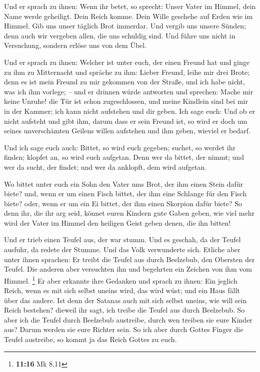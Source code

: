  Und er sprach zu ihnen: Wenn ihr betet, so sprecht: Unser
Vater im Himmel, dein Name werde geheiligt. Dein Reich komme. Dein Wille
geschehe auf Erden wie im Himmel.  Gib uns unser täglich
Brot immerdar.  Und vergib uns unsere Sünden; denn auch wir
vergeben allen, die uns schuldig sind. Und führe uns nicht in
Versuchung, sondern erlöse uns von dem Übel.

 Und er sprach zu ihnen: Welcher ist unter euch, der einen
Freund hat und ginge zu ihm zu Mitternacht und spräche zu ihm: Lieber
Freund, leihe mir drei Brote;  denn es ist mein Freund zu
mir gekommen von der Straße, und ich habe nicht, was ich ihm vorlege; --
 und er drinnen würde antworten und sprechen: Mache mir
keine Unruhe! die Tür ist schon zugeschlossen, und meine Kindlein sind
bei mir in der Kammer; ich kann nicht aufstehen und dir geben.
 Ich sage euch: Und ob er nicht aufsteht und gibt ihm, darum
dass er sein Freund ist, so wird er doch um seines unverschämten Geilens
willen aufstehen und ihm geben, wieviel er bedarf.

 Und ich sage euch auch: Bittet, so wird euch gegeben;
suchet, so werdet ihr finden; klopfet an, so wird euch aufgetan.
 Denn wer da bittet, der nimmt; und wer da sucht, der
findet; und wer da anklopft, dem wird aufgetan.

 Wo bittet unter euch ein Sohn den Vater ums Brot, der ihm
einen Stein dafür biete? und, wenn er um einen Fisch bittet, der ihm
eine Schlange für den Fisch biete?  oder, wenn er um ein Ei
bittet, der ihm einen Skorpion dafür biete?  So denn ihr,
die ihr arg seid, könnet euren Kindern gute Gaben geben, wie viel mehr
wird der Vater im Himmel den heiligen Geist geben denen, die ihn bitten!

 Und er trieb einen Teufel aus, der war stumm. Und es
geschah, da der Teufel ausfuhr, da redete der Stumme. Und das Volk
verwunderte sich.  Etliche aber unter ihnen sprachen: Er
treibt die Teufel aus durch Beelzebub, den Obersten der Teufel.
 Die anderen aber versuchten ihn und begehrten ein Zeichen
von ihm vom Himmel. \footnote{\textbf{11:16} Mk 8,11}  Er
aber erkannte ihre Gedanken und sprach zu ihnen: Ein jeglich Reich, wenn
es mit sich selbst uneins wird, das wird wüst; und ein Haus fällt über
das andere.  Ist denn der Satanas auch mit sich selbst
uneins, wie will sein Reich bestehen? dieweil ihr sagt, ich treibe die
Teufel aus durch Beelzebub.  So aber ich die Teufel durch
Beelzebub austreibe, durch wen treiben sie eure Kinder aus? Darum werden
sie eure Richter sein.  So ich aber durch Gottes Finger die
Teufel austreibe, so kommt ja das Reich Gottes zu euch.

